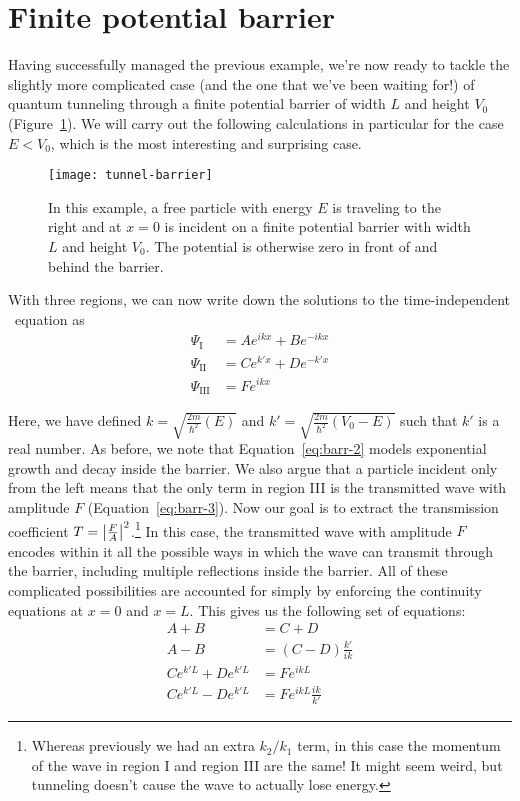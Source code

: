 \section{Finite potential barrier} \label{sec:tunnel-barrier}
Having successfully managed the previous example, we're now ready to tackle the slightly more complicated case (and the one that we've been waiting for!) of quantum tunneling through a finite potential barrier of width $L$ and height $V_0$ (Figure~\ref{fig:tunnel-barrier}). We will carry out the following calculations in particular for the case $E < V_0$, which is the most interesting and surprising case.

\begin{figure}[!h]
	\centering
	\texttt{[image: tunnel-barrier]}
	\caption{In this example, a free particle with energy $E$ is traveling to the right and at $x=0$ is incident on a finite potential barrier with width $L$ and height $V_0$. The potential is otherwise zero in front of and behind the barrier.}
	\label{fig:tunnel-barrier}
\end{figure}

With three regions, we can now write down the solutions to the time-independent \Sch\ equation as
\begin{align}
	\Psi_{\text{I}} &= Ae^{ikx} + Be^{-ikx} \label{eq:barr-1} \\
	\Psi_{\text{II}} &= Ce^{k'x} + De^{-k'x} \label{eq:barr-2} \\
	\Psi_{\text{III}} &= Fe^{ikx} \label{eq:barr-3}
\end{align}

Here, we have defined $k = \sqrt{\frac{2m}{\hbar^2}(E)}$ and $k'=\sqrt{\frac{2m}{\hbar^2}(V_0-E)}$ such that $k'$ is a real number. As before, we note that Equation~\ref{eq:barr-2} models exponential growth and decay inside the barrier. We also argue that a particle incident only from the left means that the only term in region III is the transmitted wave with amplitude $F$ (Equation~\ref{eq:barr-3}). Now our goal is to extract the transmission coefficient $T = \abs{\frac{F}{A}}^2$.\footnote{Whereas previously we had an extra $k_2/k_1$ term, in this case the momentum of the wave in region I and region III are the same! It might seem weird, but tunneling doesn't cause the wave to actually lose energy.} In this case, the transmitted wave with amplitude $F$ encodes within it all the possible ways in which the wave can transmit through the barrier, including multiple reflections inside the barrier. All of these complicated possibilities are accounted for simply by enforcing the continuity equations at $x=0$ and $x=L$. This gives us the following set of equations:
\begin{align*}
	A + B &= C + D \\
	A - B &= (C - D)\frac{k'}{ik} \\
	Ce^{k'L} + De^{k'L} &= Fe^{ikL} \\
	Ce^{k'L} - De^{k'L} &= Fe^{ikL}\frac{ik}{k'}
\end{align*}

